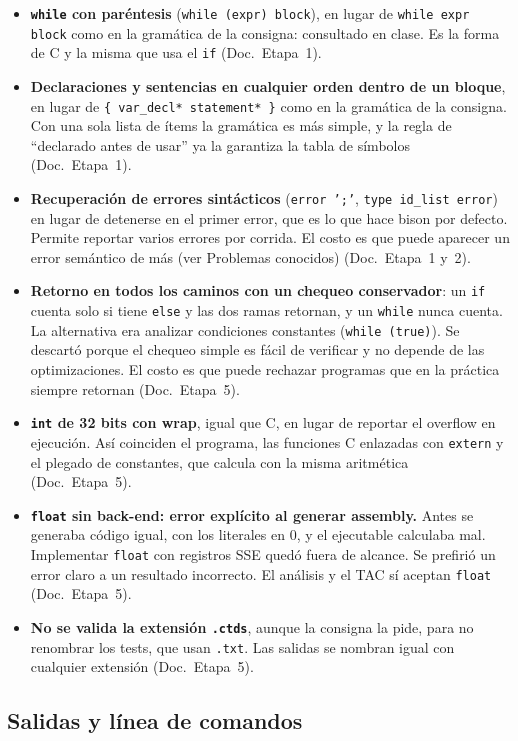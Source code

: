 \documentclass[11pt,a4paper]{article}
\newcommand{\code}[1]{\texttt{#1}}
\newcommand{\doc}[1]{(Doc.\ Etapa~#1)}
\begin{document}
\begin{itemize}
  \item \textbf{\code{while} con paréntesis} (\code{while (expr) block}), en lugar de \code{while expr block} como en la gramática de la consigna: consultado en clase. Es la forma de C y la misma que usa el \code{if} \doc{1}.
  \item \textbf{Declaraciones y sentencias en cualquier orden dentro de un bloque}, en lugar de \code{\{ var\_decl* statement* \}} como en la gramática de la consigna. Con una sola lista de ítems la gramática es más simple, y la regla de ``declarado antes de usar'' ya la garantiza la tabla de símbolos \doc{1}.
  \item \textbf{Recuperación de errores sintácticos} (\code{error ';'}, \code{type id\_list error}) en lugar de detenerse en el primer error, que es lo que hace bison por defecto. Permite reportar varios errores por corrida. El costo es que puede aparecer un error semántico de más (ver Problemas conocidos) (Doc.\ Etapa~1 y~2).
  \item \textbf{Retorno en todos los caminos con un chequeo conservador}: un \code{if} cuenta solo si tiene \code{else} y las dos ramas retornan, y un \code{while} nunca cuenta. La alternativa era analizar condiciones constantes (\code{while (true)}). Se descartó porque el chequeo simple es fácil de verificar y no depende de las optimizaciones. El costo es que puede rechazar programas que en la práctica siempre retornan \doc{5}.
  \item \textbf{\code{int} de 32 bits con wrap}, igual que C, en lugar de reportar el overflow en ejecución. Así coinciden el programa, las funciones C enlazadas con \code{extern} y el plegado de constantes, que calcula con la misma aritmética \doc{5}.
  \item \textbf{\code{float} sin back-end: error explícito al generar assembly.} Antes se generaba código igual, con los literales en 0, y el ejecutable calculaba mal. Implementar \code{float} con registros SSE quedó fuera de alcance. Se prefirió un error claro a un resultado incorrecto. El análisis y el TAC sí aceptan \code{float} \doc{5}.
  \item \textbf{No se valida la extensión \code{.ctds}}, aunque la consigna la pide, para no renombrar los tests, que usan \code{.txt}. Las salidas se nombran igual con cualquier extensión \doc{5}.
\end{itemize}

\subsection*{Salidas y línea de comandos}
\end{document}
